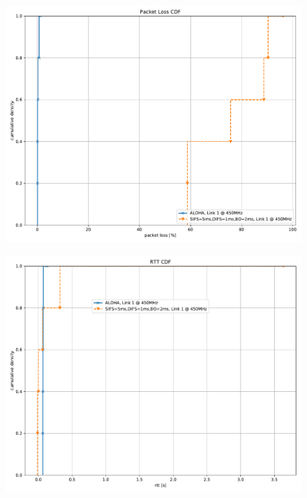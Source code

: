 \documentclass{article}
\begin{document}
\begin{figure}
	\includegraphics[width=\textwidth]{aloha_rb_low/cdf/packet_loss_cdf}
\end{figure}

\begin{figure}
	\includegraphics[width=\textwidth]{aloha_rb_low/cdf/rtt_cdf}
\end{figure}
\end{document}

